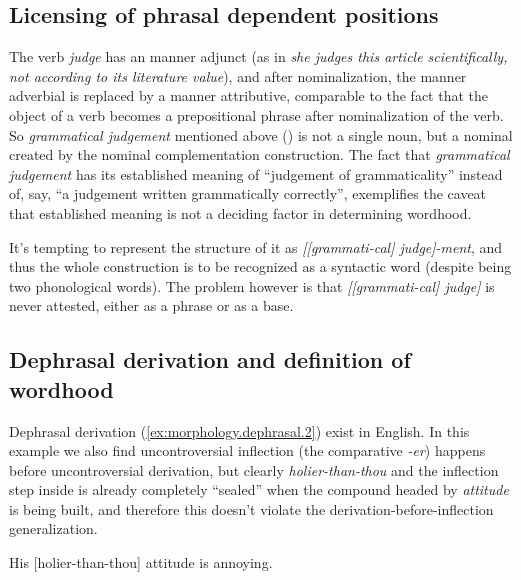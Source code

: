 \documentclass[UTF8, a4paper, oneside, scheme=plain, 12pt]{ctexbook}
\newcommand*{\citepage}[1]{p.~{#1}}
\newcommand{\form}[1]{\emph{#1}}
\begin{document}
\subsection{Licensing of phrasal dependent positions}\label{sec:pos.word.semantics}

The verb \form{judge} has 
an manner adjunct 
(as in \form{she judges this article scientifically, 
not according to its literature value}),
and after nominalization,
the manner adverbial is 
replaced by a manner attributive,
comparable to the fact that the object of a verb 
becomes a prepositional phrase after nominalization of the verb. 
So \form{grammatical judgement} mentioned above
() is not a single noun,
but a nominal created by the nominal complementation construction.
The fact that \form{grammatical judgement} has its established meaning 
of ``judgement of grammaticality''
instead of, say, ``a judgement written grammatically correctly'',
exemplifies the caveat 
that established meaning is not a deciding factor in determining wordhood.

It's tempting to represent the structure of it as 
\form{[[grammati-cal] judge]-ment},
and thus the whole construction is to be recognized as a syntactic word
(despite being two phonological words).
The problem however is that \form{[[grammati-cal] judge]}
is never attested,
either as a phrase or as a base.

\subsection{Dephrasal derivation and definition of wordhood}\label{sec:morphology.dephrasal}

Dephrasal derivation (\ref{ex:morphology.dephrasal.2}) exist in English.
In this example we also find uncontroversial inflection (the comparative \form{-er}) happens 
before uncontroversial derivation,
but clearly \form{holier-than-thou} 
and the inflection step inside is already completely ``sealed''
when the compound headed by \form{attitude} is being built,
and therefore this doesn't violate the derivation-before-inflection generalization.

\begin{exe}
    \ex\label{ex:morphology.dephrasal.2} His [holier-than-thou] attitude is annoying. \citep[\citepage{1646}]{cgel}
\end{exe}
\end{document}
